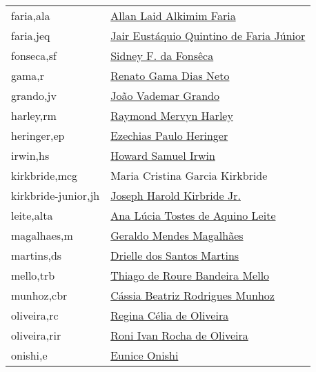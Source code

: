 \begin{longtable}{l l}
faria,ala           & \href{http://lattes.cnpq.br/3988533384771339}{Allan Laid Alkimim Faria} \\
faria,jeq           & \href{http://lattes.cnpq.br/3214384669945455}{Jair Eustáquio Quintino de Faria Júnior} \\
fonseca,sf          & \href{https://plants.jstor.org/stable/10.5555/al.ap.person.bm000117349}{Sidney F. da Fonsêca} \\                 
gama,r              & \href{http://lattes.cnpq.br/7699197078019809}{Renato Gama Dias Neto} \\
grando,jv           & \href{http://lattes.cnpq.br/6229685164094420}{João Vademar Grando} \\
harley,rm           & \href{https://plants.jstor.org/stable/10.5555/al.ap.person.bm000003418}{Raymond Mervyn Harley} \\                
heringer,ep         & \href{https://plants.jstor.org/stable/10.5555/al.ap.person.bm000003587}{Ezechias Paulo Heringer} \\              
irwin,hs            & \href{https://plants.jstor.org/stable/10.5555/al.ap.person.bm000003953}{Howard Samuel Irwin} \\                  
kirkbride,mcg       & Maria Cristina Garcia Kirkbride \\
kirkbride-junior,jh & \href{https://plants.jstor.org/stable/10.5555/al.ap.person.bm000011449}{Joseph Harold Kirbride Jr.} \\
leite,alta          & \href{http://lattes.cnpq.br/7719191749294093 }{Ana Lúcia Tostes de Aquino Leite} \\
magalhaes,m         & \href{https://plants.jstor.org/stable/10.5555/al.ap.person.bm000005315}{Geraldo Mendes Magalhães} \\             
martins,ds          & \href{http://lattes.cnpq.br/5209656812635059}{Drielle dos Santos Martins} \\
mello,trb           & \href{http://lattes.cnpq.br/0930415350491316 }{Thiago de Roure Bandeira Mello} \\
munhoz,cbr          & \href{http://lattes.cnpq.br/9973242126324510}{Cássia Beatriz Rodrigues Munhoz} \\
oliveira,rc         & \href{http://lattes.cnpq.br/2968817136128886}{Regina Célia de Oliveira} \\
oliveira,rir        & \href{http://lattes.cnpq.br/7006488728244815}{Roni Ivan Rocha de Oliveira} \\
onishi,e            & \href{https://plants.jstor.org/stable/10.5555/al.ap.person.bm000053001}{Eunice Onishi} \\                        

\end{longtable}
